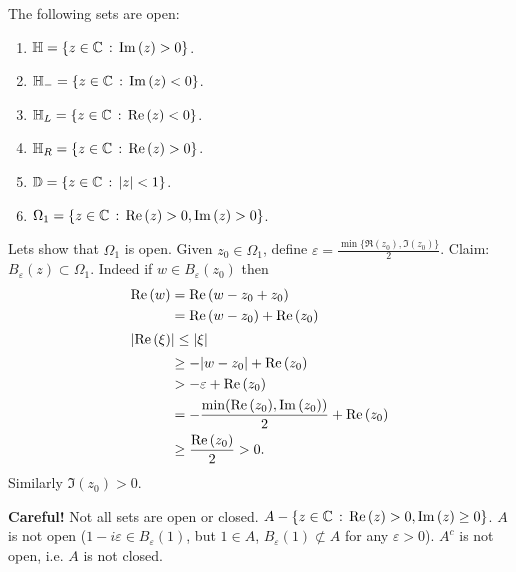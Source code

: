 \documentclass[10pt, a4paper]{article}
\begin{document}
\begin{example}
    The following sets are open:

    \begin{enumerate}[label = (\roman*)]
        \item $\mathbb{H} = \{z \in \C\,:\,\Im(z) > 0\}$.
        
        \item $\mathbb{H}_{-} = \{z \in \C\,:\,\Im(z) < 0\}$.
        
        \item $\mathbb{H}_{L} = \{z \in \C\,:\,\Re(z) < 0\}$.
        
        \item $\mathbb{H}_{R} = \{z \in \C\,:\,\Re(z) > 0\}$.
        
        \item $\mathbb{D} = \{z \in \C\,:\,|z| < 1\}$.
        
        \item $\Omega_1 = \{z \in \C\,:\,\Re(z) > 0, \Im(z) > 0\}$.
    \end{enumerate}

    Lets show that $\Omega_1$ is open.
    Given $z_0 \in \Omega_1$,
    define $\varepsilon = \frac{\min\{\Re(z_0), \Im(z_0)\}}{2}$.
    Claim:
    $B_{\varepsilon}(z) \subset \Omega_1$.
    Indeed if $w \in B_{\varepsilon}(z_0)$ then
    \begin{align*}
        \Re(w) &= \Re(w - z_0  + z_0) \\
        &= \Re(w - z_0) + \Re(z_0) \\
        \intertext{$|\Re(\xi)| \leq |\xi|$}
        &\geq -|w - z_0| + \Re(z_0) \\
        &> -\varepsilon + \Re(z_0) \\
        &= -\frac{\min(\Re(z_0), \Im(z_0))}{2} + \Re(z_0) \\
        &\geq \frac{\Re(z_0)}{2} > 0.
    \end{align*}
    Similarly $\Im(z_0) > 0$.
\end{example}

\textbf{Careful!}
Not all sets are open or closed.
$A - \{z \in \C\,:\,\Re(z) > 0, \Im(z) \geq 0\}$.
$A$ is not open
($1 - i\varepsilon \in B_{\varepsilon}(1)$,
but $1 \in A$,
$B_{\varepsilon}(1) \not\subset A$ for any $\varepsilon > 0$).
$A ^ c$ is not open,
i.e. $A$ is not closed.
\end{document}
